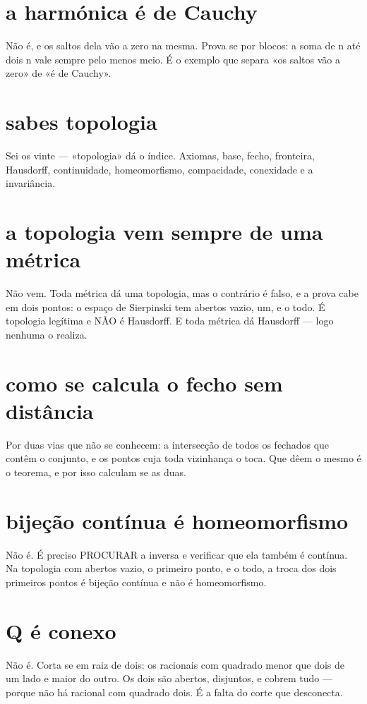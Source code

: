 \documentclass[11pt,a4paper]{article}
\begin{document}
\section{a harmónica é de Cauchy}
Não é, e os saltos dela vão a zero na mesma. Prova se por blocos: a soma de n até dois n
vale sempre pelo menos meio. É o exemplo que separa «os saltos vão a zero» de «é de
Cauchy».

\section{sabes topologia}
Sei os vinte — «topologia» dá o índice. Axiomas, base, fecho, fronteira, Hausdorff,
continuidade, homeomorfismo, compacidade, conexidade e a invariância.

\section{a topologia vem sempre de uma métrica}
Não vem. Toda métrica dá uma topologia, mas o contrário é falso, e a prova cabe em dois
pontos: o espaço de Sierpinski tem abertos vazio, um, e o todo. É topologia legítima e
NÃO é Hausdorff. E toda métrica dá Hausdorff — logo nenhuma o realiza.

\section{como se calcula o fecho sem distância}
Por duas vias que não se conhecem: a intersecção de todos os fechados que contêm o
conjunto, e os pontos cuja toda vizinhança o toca. Que dêem o mesmo é o teorema, e por
isso calculam se as duas.

\section{bijeção contínua é homeomorfismo}
Não é. É preciso PROCURAR a inversa e verificar que ela também é contínua. Na topologia
com abertos vazio, o primeiro ponto, e o todo, a troca dos dois primeiros pontos é
bijeção contínua e não é homeomorfismo.

\section{Q é conexo}
Não é. Corta se em raiz de dois: os racionais com quadrado menor que dois de um lado e
maior do outro. Os dois são abertos, disjuntos, e cobrem tudo — porque não há racional
com quadrado dois. É a falta do corte que desconecta.
\end{document}
